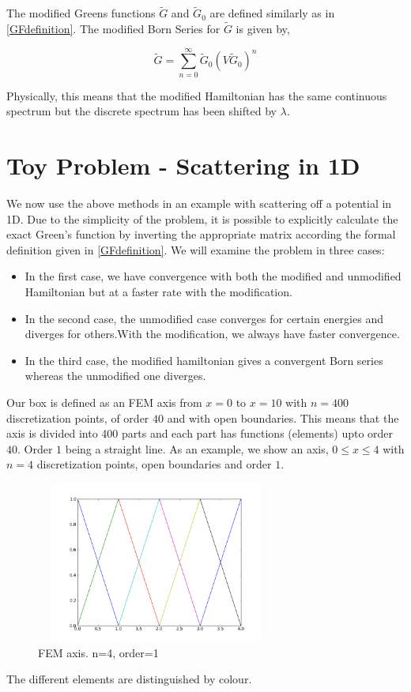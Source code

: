 \documentclass[a4paper,10pt]{report}
\begin{document}
The modified Greens functions $\widetilde{G}$ and $\widetilde{G}_0$ are defined similarly as
in \eqref{GFdefinition}. The modified Born Series for $\widetilde{G}$ is given by,

\begin{equation}\label{BornSeriesModCompact}
 \widetilde{G}=\displaystyle\sum_{n=0}^{\infty}\widetilde{G}_0\left(V\widetilde{G}_0\right)^n
\end{equation}

\noindent Physically, this means that the modified Hamiltonian has the same continuous spectrum but the discrete
spectrum has been shifted by $\lambda$.

\section{Toy Problem - Scattering in 1D}
We now use the above methods in an example with scattering off a potential in 1D. Due to the simplicity of the problem,
it is possible to explicitly calculate the exact Green's function by inverting the appropriate matrix according the formal
definition given in \eqref{GFdefinition}. We will examine the problem in three cases: 
\begin{itemize}
 \item In the first case, we have convergence with both the modified and unmodified Hamiltonian but at a faster rate with the modification.
 \item In the second case, the unmodified case converges for certain energies and diverges for others.With the modification, we always have
       faster convergence.
 \item In the third case, the modified hamiltonian gives a convergent Born series whereas the unmodified one diverges. 
\end{itemize}

Our box is defined as an FEM axis from $x=0$ to $x=10$ with $n=400$ discretization points, 
of order $40$ and with open boundaries. This means that the axis is divided into 400 
parts and each part has functions (elements) upto order $40$. Order $1$ being a straight
line. As an example, we show an axis, $0\leq x\leq 4$ with $n=4$ discretization points, open
boundaries and order $1$.

\begin{figure}[hm]
\centering
\includegraphics[width=225pt, height=150pt]{femexample1.png}
\caption[\textwidth]{FEM axis. n=4, order=1}
\end{figure}
The different elements are distinguished by colour.
\end{document}
